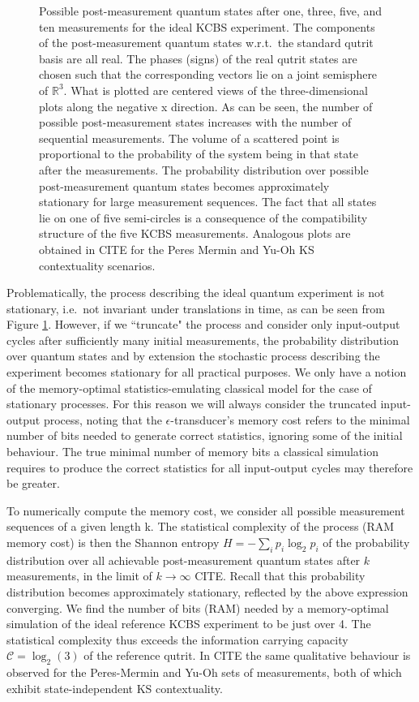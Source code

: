 \begin{figure}
        \caption{Possible post-measurement quantum states after one, three, five, and ten measurements for the ideal KCBS experiment. The components of the post-measurement quantum states w.r.t.\ the standard qutrit basis are all real. The phases (signs) of the real qutrit states are chosen such that the corresponding vectors lie on a joint semisphere of $\mathbb{R}^3$. What is plotted are centered views of the three-dimensional plots along the negative x direction. As can be seen, the number of possible post-measurement states increases with the number of sequential measurements. The volume of a scattered point is proportional to the probability of the system being in that state after the measurements. The probability distribution over possible post-measurement quantum states becomes approximately stationary for large measurement sequences. The fact that all states lie on one of five semi-circles is a consequence of the compatibility structure of the five KCBS measurements. Analogous plots are obtained in CITE for the Peres Mermin and Yu-Oh KS contextuality scenarios.}
        \label{fig:causalstates}
    \end{figure}

Problematically, the process describing the ideal quantum experiment is not stationary, i.e.\ not invariant under translations in time, as can be seen from Figure \ref{fig:causalstates}. However, if we ``truncate" the process and consider only input-output cycles after sufficiently many initial measurements, the probability distribution over quantum states and by extension the stochastic process describing the experiment becomes stationary for all practical purposes. We only have a notion of the memory-optimal statistics-emulating classical model for the case of stationary processes. For this reason we will always consider the truncated input-output process, noting that the $\epsilon$-transducer's memory cost refers to the minimal number of bits needed to generate correct statistics, ignoring some of the initial behaviour. The true minimal number of memory bits a classical simulation requires to produce the correct statistics for all input-output cycles may therefore be greater. 

To numerically compute the memory cost, we consider all possible measurement sequences of a given length k. The statistical complexity of the process (RAM memory cost) is then the Shannon entropy $H=-\sum_ip_i\log_2p_i$ of the probability distribution over all achievable post-measurement quantum states after $k$ measurements, in the limit of $k\rightarrow\infty$ CITE. Recall that this probability distribution becomes approximately stationary, reflected by the above expression converging. We find the number of bits (RAM) needed by a memory-optimal simulation of the ideal reference KCBS experiment to be just over 4. The statistical complexity thus exceeds the information carrying capacity $\mathcal{C}=\log_2(3)$ of the reference qutrit. In CITE the same qualitative behaviour is observed for the Peres-Mermin and Yu-Oh sets of measurements, both of which exhibit state-independent KS contextuality. 

